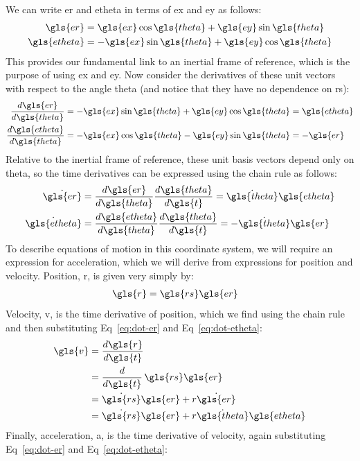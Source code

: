 \documentclass[12pt,openany]{book}
\begin{document}
We can write \gls{er} and \gls{etheta} in terms of \gls{ex} and \gls{ey} as follows:
\begin{align}
  \gls{er} &= \gls{ex}\cos\gls{theta} + \gls{ey}\sin\gls{theta} \\
  \gls{etheta} &= -\gls{ex}\sin\gls{theta} + \gls{ey}\cos\gls{theta}
\end{align}
This provides our fundamental link to an inertial frame of reference, which is the purpose of using \gls{ex} and \gls{ey}. Now consider the derivatives of these unit vectors with respect to the angle \gls{theta} (and notice that they have no dependence on \gls{rs}):
\begin{align}
  \frac{d\gls{er}}{d\gls{theta}}
  &= -\gls{ex}\sin\gls{theta} + \gls{ey}\cos\gls{theta} = \gls{etheta} \\
  \frac{d\gls{etheta}}{d\gls{theta}}
  &= -\gls{ex}\cos\gls{theta} - \gls{ey}\sin\gls{theta} = -\gls{er}
\end{align}
Relative to the inertial frame of reference, these unit basis vectors depend only on \gls{theta}, so the time derivatives can be expressed using the chain rule as follows:
\begin{align}
  \dot{\gls{er}} &= \frac{d\gls{er}}{d\gls{theta}}\frac{d\gls{theta}}{d\gls{t}}
  = \dot{\gls{theta}}\gls{etheta}
  \label{eq:dot-er}
  \\
  \dot{\gls{etheta}} &= \frac{d\gls{etheta}}{d\gls{theta}}\frac{d\gls{theta}}{d\gls{t}}
  = -\dot{\gls{theta}}\gls{er}
  \label{eq:dot-etheta}
\end{align}
To describe equations of motion in this coordinate system, we will require an expression for acceleration, which we will derive from expressions for position and velocity. Position, \gls{r}, is given very simply by:
\begin{align}
  \gls{r} &= \gls{rs}\gls{er}
\end{align}
Velocity, \gls{v}, is the time derivative of position, which we find using the chain rule and then substituting Eq~\ref{eq:dot-er} and Eq~\ref{eq:dot-etheta}:
\begin{align}
  \gls{v} &= \frac{d\gls{r}}{d\gls{t}} \\
  &= \frac{d}{d\gls{t}}\,\gls{rs}\gls{er} \\
  &= \dot{\gls{rs}}\gls{er} + r\dot{\gls{er}} \\
  &= \dot{\gls{rs}}\gls{er} + r\dot{\gls{theta}}\gls{etheta}
\end{align}
Finally, acceleration, \gls{a}, is the time derivative of velocity, again substituting Eq~\ref{eq:dot-er} and Eq~\ref{eq:dot-etheta}:
\end{document}
